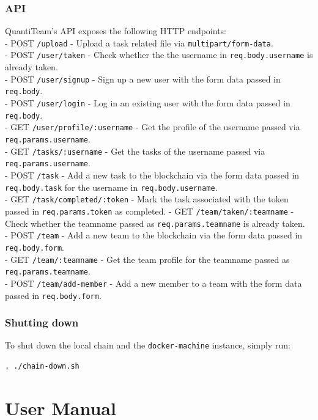 \subsection{API}\label{api}

QuantiTeam's API exposes the following HTTP endpoints:\\
- POST
\texttt{/upload} - Upload a task related file via
\texttt{multipart/form-data}.\\
- POST \texttt{/user/taken} - Check whether the the username in
\texttt{req.body.username} is already taken.\\
- POST \texttt{/user/signup} - Sign up a new user with the form data
passed in \texttt{req.body}.\\
- POST \texttt{/user/login} - Log in an existing user with the form data
passed in \texttt{req.body}.\\
- GET \texttt{/user/profile/:username} - Get the profile of the username
passed via \texttt{req.params.username}.\\
- GET \texttt{/tasks/:username} - Get the tasks of the username passed
via \texttt{req.params.username}.\\
- POST \texttt{/task} - Add a new task to the blockchain via the form
data passed in \texttt{req.body.task} for the username in
\texttt{req.body.username}.\\
- GET \texttt{/task/completed/:token} - Mark the task associated with
the token passed in \texttt{req.params.token} as completed. - GET
\texttt{/team/taken/:teamname} - Check whether the teamname passed as
\texttt{req.params.teamname} is already taken.\\
- POST \texttt{/team} - Add a new team to the blockchain via the form
data passed in \texttt{req.body.form}.\\
- GET \texttt{/team/:teamname} - Get the team profile for the teamname
passed as \texttt{req.params.teamname}.\\
- POST \texttt{/team/add-member} - Add a new member to a team with the
form data passed in \texttt{req.body.form}.

\subsection{Shutting down}\label{shutting-down}

To shut down the local chain and the \texttt{docker-machine} instance,
simply run:

\begin{verbatim}
. ./chain-down.sh
\end{verbatim}


\chapter{User Manual}



